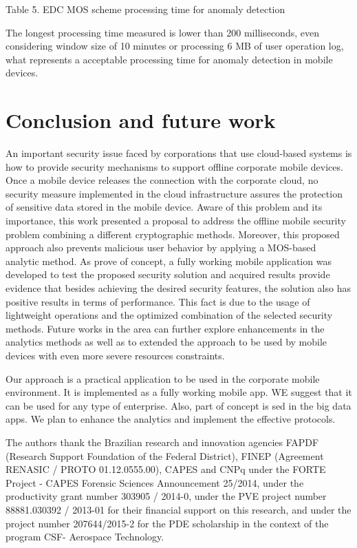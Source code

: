 \documentclass[twocolumn]{svjour3}          	%
\begin{document}
Table 5. EDC MOS scheme processing time for anomaly detection 

The longest processing time measured is lower than 200 milliseconds, even considering window size of 10 minutes or processing 6 MB of user operation log, what represents a acceptable processing time for anomaly detection in mobile devices.

\section{Conclusion and future work }
\label{sec_conclusion}
An important security issue faced by corporations that use cloud-based systems is how to provide security mechanisms to support offline corporate mobile devices. Once a mobile device releases the connection with the corporate cloud, no security measure implemented in the cloud infrastructure assures the protection of sensitive data stored in the mobile device. Aware of this problem and its importance, this work presented a proposal to address the offline mobile security problem combining a different cryptographic methods. Moreover, this proposed approach also prevents malicious user behavior by applying a MOS-based analytic method. As prove of concept, a fully working mobile application was developed to test the proposed security solution and acquired results provide evidence that besides achieving the desired security features, the solution also has positive results in terms of performance. This fact is due to the usage of lightweight operations and the optimized combination of the selected security methods. 
Future works in the area can further explore enhancements in the analytics methods as well as to extended the approach to be used by mobile devices with even more severe resources constraints.   

Our approach is a practical application to be used in the corporate mobile environment. It is implemented as a fully working mobile app. WE suggest that it can be used for any type of enterprise. Also, part of concept is sed in the big data apps. We plan to enhance the analytics and implement the effective protocols.

\begin{acknowledgements}
The authors thank the Brazilian research and innovation agencies FAPDF (Research Support Foundation of the Federal District), FINEP (Agreement RENASIC / PROTO 01.12.0555.00), CAPES and CNPq under the FORTE Project - CAPES Forensic Sciences Announcement 25/2014, under the productivity grant number 303905 / 2014-0, under the PVE project number 88881.030392 / 2013-01 for their financial support on this research, and under the project number 207644/2015-2 for the PDE scholarship in the context of the program CSF- Aerospace Technology.\end{acknowledgements}

\end{document}
